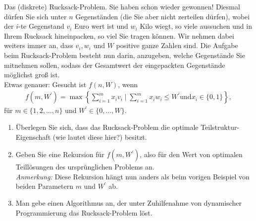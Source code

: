 
\begin{exercise}

Das (diskrete) Rucksack-Problem. Sie haben schon wieder gewonnen! Diesmal dürfen
Sie sich unter $n$ Gegenständen (die Sie aber nicht zerteilen dürfen), wobei der
$i$-te Gegenstand $v_i$ Euro wert ist und $w_i$ Kilo wiegt, so viele aussuchen und
in Ihrem Rucksack hineinpacken, so viel Sie tragen können. Wir nehmen dabei weiters
immer an, dass $v_i,w_i$ und $W$ positive ganze Zahlen sind. Die Aufgabe beim
\glqq Rucksack-Problem \grqq besteht nun darin, anzugeben, welche Gegenstände
Sie mitnehmen sollen, sodass der Gesamtwert der eingepackten Gegenstände möglichst groß ist. \\
Etwas genauer: Gesucht ist $f(n,W)$, wenn
\begin{align*}
  f(m, W^{\prime}) = \max\left\{\sum_{i=1}^m x_iv_i \mid \sum_{i=1}^m x_iw_i \leq
  W^{\prime} \text{und} x_i \in \{0,1\}\right\},
\end{align*}
für $m \in \{1,2,\dots,n\}$ und $W^{\prime} \in \{0,\dots,W\}$.
\begin{enumerate}[label = \alph*)]
  \item Überlegen Sie sich, dass das Rucksack-Problem die optimale Teilstruktur-Eigenschaft
  (wie lautet diese hier?) besitzt.
  \item Geben Sie eine Rekursion für $f(m,W^{\prime})$, also für den Wert von
  optimalen Teillösungen des ursprünglichen Problems an. \\
  \textit{Anmerkung:} Diese Rekursion hängt nun anders als beim vorigen Beispiel von beiden Parametern $m$ und $W^{\prime}$
  ab.
  \item Man gebe einen Algorithmus an, der unter Zuhilfenahme von dynamischer Programmierung
  das Rucksack-Problem löst.
\end{enumerate}
\end{exercise}



